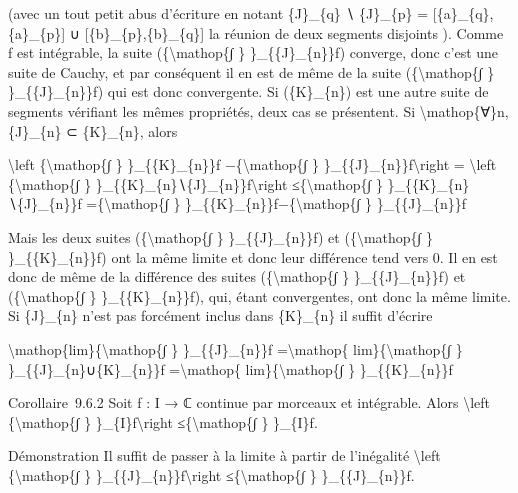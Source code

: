 \documentclass[]{article}
\begin{document}
(avec un tout petit abus d'écriture en notant \{J\}\_\{q\} ∖
\{J\}\_\{p\} = {[}\{a\}\_\{q\},\{a\}\_\{p\}{]} ∪
{[}\{b\}\_\{p\},\{b\}\_\{q\}{]} la réunion de deux segments disjoints ).
Comme \textbar{}f\textbar{} est intégrable, la suite
(\{\textbackslash{}mathop\{∫ \}
\}\_\{\{J\}\_\{n\}\}\textbar{}f\textbar{}) converge, donc c'est une
suite de Cauchy, et par conséquent il en est de même de la suite
(\{\textbackslash{}mathop\{∫ \} \}\_\{\{J\}\_\{n\}\}f) qui est donc
convergente. Si (\{K\}\_\{n\}) est une autre suite de segments vérifiant
les mêmes propriétés, deux cas se présentent. Si
\textbackslash{}mathop\{∀\}n, \{J\}\_\{n\} ⊂ \{K\}\_\{n\}, alors

\textbackslash{}left \textbar{}\{\textbackslash{}mathop\{∫ \}
\}\_\{\{K\}\_\{n\}\}f −\{\textbackslash{}mathop\{∫ \}
\}\_\{\{J\}\_\{n\}\}f\textbackslash{}right \textbar{} =
\textbackslash{}left \textbar{}\{\textbackslash{}mathop\{∫ \}
\}\_\{\{K\}\_\{n\}∖\{J\}\_\{n\}\}f\textbackslash{}right
\textbar{}≤\{\textbackslash{}mathop\{∫ \}
\}\_\{\{K\}\_\{n\}∖\{J\}\_\{n\}\}\textbar{}f\textbar{}
=\{\textbackslash{}mathop\{∫ \}
\}\_\{\{K\}\_\{n\}\}\textbar{}f\textbar{}−\{\textbackslash{}mathop\{∫ \}
\}\_\{\{J\}\_\{n\}\}\textbar{}f\textbar{}

Mais les deux suites (\{\textbackslash{}mathop\{∫ \}
\}\_\{\{J\}\_\{n\}\}\textbar{}f\textbar{}) et
(\{\textbackslash{}mathop\{∫ \}
\}\_\{\{K\}\_\{n\}\}\textbar{}f\textbar{}) ont la même limite et donc
leur différence tend vers 0. Il en est donc de même de la différence des
suites (\{\textbackslash{}mathop\{∫ \} \}\_\{\{J\}\_\{n\}\}f) et
(\{\textbackslash{}mathop\{∫ \} \}\_\{\{K\}\_\{n\}\}f), qui, étant
convergentes, ont donc la même limite. Si \{J\}\_\{n\} n'est pas
forcément inclus dans \{K\}\_\{n\} il suffit d'écrire

\textbackslash{}mathop\{lim\}\{\textbackslash{}mathop\{∫ \}
\}\_\{\{J\}\_\{n\}\}f =\textbackslash{}mathop\{
lim\}\{\textbackslash{}mathop\{∫ \} \}\_\{\{J\}\_\{n\}∪\{K\}\_\{n\}\}f
=\textbackslash{}mathop\{ lim\}\{\textbackslash{}mathop\{∫ \}
\}\_\{\{K\}\_\{n\}\}f

Corollaire~9.6.2 Soit f : I → ℂ continue par morceaux et intégrable.
Alors \textbackslash{}left \textbar{}\{\textbackslash{}mathop\{∫ \}
\}\_\{I\}f\textbackslash{}right \textbar{}≤\{\textbackslash{}mathop\{∫
\} \}\_\{I\}\textbar{}f\textbar{}.

Démonstration Il suffit de passer à la limite à partir de l'inégalité
\textbackslash{}left \textbar{}\{\textbackslash{}mathop\{∫ \}
\}\_\{\{J\}\_\{n\}\}f\textbackslash{}right \textbar{}
≤\{\textbackslash{}mathop\{∫ \}
\}\_\{\{J\}\_\{n\}\}\textbar{}f\textbar{}.
\end{document}
